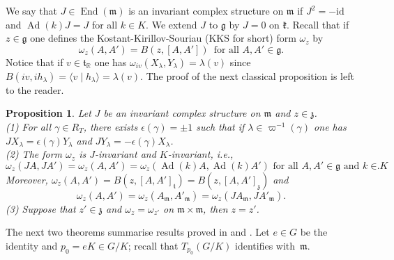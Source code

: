 \documentclass[a4paper,reqno]{amsart}
\newtheorem{prop}[thm]{Proposition}
\theoremstyle{definition}
\theoremstyle{remark}
\theoremstyle{plain}
\numberwithin{equation}{section}
\newcommand{\R}{{\mathbb{R}}}
\newcommand{\g}{{\mathfrak{g}}}  %
\newcommand{\fm}{{\mathfrak{m}}}
\newcommand{\fk}{{\mathfrak{k}}}  \renewcommand{\k}{{\mathfrak{k}}}
\newcommand{\fz}{{\mathfrak{z}}}
\newcommand{\ft}{{\mathfrak{t}}}
\def\End{\operatorname {End}}
\DeclareMathOperator{\Ad}{{Ad}}
\newcommand{\id}{{\mathrm{id}}}
\newcommand{\ascal}[2]{{\langle {#1}  \mid {#2} \rangle}}
\newcommand{\vpi}{\varpi}
\newcommand{\tR}{{\mathfrak{t}_\R}}
\newcommand{\pzero}{{p_0}}
\begin{document}
We say that $J \in \End(\fm)$ is an invariant complex structure
on $\fm$ if $J^2 = -\id$ and $\Ad(k)J = J$ for all $k \in K$. We
extend $J$ to $\g$ by $J=0$ on $\fk$.  Recall that if $z \in \g$ one
defines the Kostant-Kirillov-Souriau (KKS for short) form
$\omega_{z}$ by
\begin{equation*} \label{KKZ}
\omega_z(A,A') = B(z,[A,A']) \ \; \text{for all $A,A' \in \g$.}
\end{equation*}
Notice that if $v \in \tR$ one has
$\omega_{iv}(X_\lambda,Y_\lambda) = \lambda(v)$ since
$B(iv,ih_\lambda) = \ascal{v}{h_\lambda} = \lambda(v)$.  The
proof of the next classical proposition is left to the reader.

\begin{prop}
  \label{prop6.6}
  Let $J$ be an invariant complex structure on $\fm$ and
  $z \in \fz$.
  \\
  {\rm (1)} For all $\gamma \in
  R_T$, there exists $\epsilon(\gamma)= \pm
  1$ such that if $\lambda \in \vpi^{-1}(\gamma)$ one has
  $J X_\lambda = \epsilon(\gamma) Y_\lambda$ and
  $J Y_\lambda= - \epsilon(\gamma) X _\lambda$.
  \\
  {\rm (2)} The form $\omega_{z}$ is $J
  $-invariant and $K$-invariant, i.e.,
\[
\text{$\omega_{z}(JA,JA') =
  \omega_{z}(A,A') = \omega_z(\Ad(k)A,\Ad(k)A')$ for all $A,A' \in
  \g$ and $k \in K$}. 
\]
Moreover, $\omega_z(A,A')= B(z,[A,A']_\ft) =
  B(z,[A,A']_\fz)$ and
\[
\omega_z(A,A') = \omega_z(A_\fm,A'_\fm) %
=\omega_z(JA_\fm,JA'_\fm).  
\]
{\rm (3)} Suppose that $z'  \in
  \fz$ and $\omega_z= \omega_{z'}$
  on $\fm \times \fm$, then $z=z'$.
 \end{prop}

 
The next two theorems summarise results proved in
 \cite[Propositions~7.5, 7.6, 7.7]{Arv} and \cite[Theorem~4.7,
 Proposition~9.3, Theorem~9.4]{WG}.  Let $e \in G$ be the identity
 and $\pzero = eK \in G/K$; recall that $T_\pzero (G/K)$ identifies
 with~$\fm$. 
\end{document}
